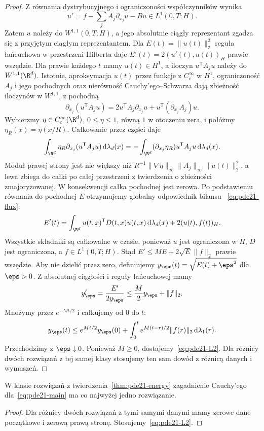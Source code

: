 \begin{proof}
Z równania dystrybucyjnego i ograniczoności
współczynników wynika
\[
 u'=f-\sum_j A_j\partial_{x_j}u-Bu\in L^1(0,T;H).
\]
Zatem $u$ należy do $W^{1,1}(0,T;H)$,
a jego absolutnie ciągły reprezentant zgadza się
z przyjętym ciągłym reprezentantem.
Dla $E(t)=\|u(t)\|_2^2$ reguła łańcuchowa w przestrzeni
Hilberta daje $E'(t)=2(u'(t),u(t))_H$ prawie wszędzie.
Dla prawie każdego $t$ mamy $u(t)\in H^1$,
a iloczyn $u^\mathsf TA_ju$ należy do $W^{1,1}(\R^d)$.
Istotnie, aproksymacja $u(t)$ przez funkcje z
$C_c^\infty$ w $H^1$, ograniczoność $A_j$ i jego
pochodnych oraz nierówność Cauchy'ego--Schwarza
dają zbieżność iloczynów w $W^{1,1}$, z pochodną
\[
 \partial_{x_j}(u^\mathsf TA_ju)
 =2u^\mathsf TA_j\partial_{x_j}u+
 u^\mathsf T(\partial_{x_j}A_j)u.
\]
Wybierzmy $\eta\in C_c^\infty(\R^d)$, $0\le\eta\le1$,
równą $1$ w otoczeniu zera, i połóżmy
$\eta_R(x)=\eta(x/R)$. Całkowanie przez części daje
\[
 \int_{\R^d}\eta_R\partial_{x_j}(u^\mathsf TA_ju)
 \,\mathrm d\lambda_d(x)
 =-\int_{\R^d}(\partial_{x_j}\eta_R)u^\mathsf TA_ju
 \,\mathrm d\lambda_d(x).
\]
Moduł prawej strony jest nie większy niż
$R^{-1}\|\nabla\eta\|_\infty\|A_j\|_\infty\|u(t)\|_2^2$,
a lewa zbiega do całki po całej przestrzeni
z twierdzenia o zbieżności zmajoryzowanej.
W konsekwencji całka pochodnej jest zerowa.
Po podstawieniu równania do pochodnej $E$
otrzymujemy globalny odpowiednik bilansu
~\eqref{eq:pde21-flux}:
\[
 E'(t)=\int_{\R^d}u(t,x)^\mathsf TD(t,x)u(t,x)
 \,\mathrm d\lambda_d(x)+2(u(t),f(t))_H.
\]
Wszystkie składniki są całkowalne w czasie,
ponieważ $u$ jest ograniczona w $H$, $D$ jest
ograniczona, a $f\in L^1(0,T;H)$.
Stąd $E'\le ME+2\sqrt E\|f\|_2$ prawie wszędzie.
Aby nie dzielić przez zero, definiujemy
$y_\eps(t)=\sqrt{E(t)+\eps^2}$ dla $\eps>0$.
Z absolutnej ciągłości i reguły łańcuchowej mamy
\[
 y_\eps'=\frac{E'}{2y_\eps}
 \le\frac{M}{2}y_\eps+\|f\|_2.
\]
Mnożymy przez $e^{-Mt/2}$ i całkujemy od $0$ do $t$:
\[
 y_\eps(t)\le e^{Mt/2}y_\eps(0)
 +\int_0^t e^{M(t-r)/2}\|f(r)\|_2\,\mathrm d\lambda_1(r).
\]
Przechodzimy z $\eps\downarrow0$. Ponieważ $M\ge0$,
dostajemy~\eqref{eq:pde21-L2}. Dla różnicy dwóch
rozwiązań z tej samej klasy stosujemy ten sam dowód
z różnicą danych i wymuszeń.
\end{proof}

\begin{wniosek}[Jednoznaczność]
W klasie rozwiązań z twierdzenia~\ref{thm:pde21-energy}
zagadnienie Cauchy'ego dla~\eqref{eq:pde21-main}
ma co najwyżej jedno rozwiązanie.
\end{wniosek}
\begin{proof}
Dla różnicy dwóch rozwiązań z tymi samymi danymi mamy zerowe
dane początkowe i zerową prawą stronę. Stosujemy~\eqref{eq:pde21-L2}.
\end{proof}

